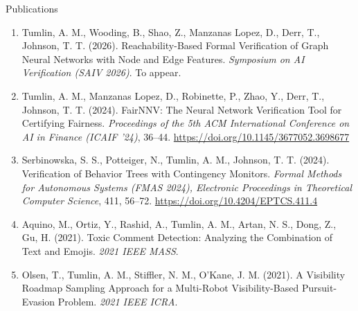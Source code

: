 \documentclass{resume}
\begin{document}
\begin{rSection}{Publications}
\begin{enumerate}
    \item Tumlin, A. M., Wooding, B., Shao, Z., Manzanas Lopez, D., Derr, T., Johnson, T. T. (2026). Reachability-Based Formal Verification of Graph Neural Networks with Node and Edge Features. \textit{Symposium on AI Verification (SAIV 2026)}. To appear.
    \item Tumlin, A. M., Manzanas Lopez, D., Robinette, P., Zhao, Y., Derr, T., Johnson, T. T. (2024). FairNNV: The Neural Network Verification Tool for Certifying Fairness. \textit{Proceedings of the 5th ACM International Conference on AI in Finance (ICAIF '24)}, 36--44. \url{https://doi.org/10.1145/3677052.3698677}
    \item Serbinowska, S. S., Potteiger, N., Tumlin, A. M., Johnson, T. T. (2024). Verification of Behavior Trees with Contingency Monitors. \textit{Formal Methods for Autonomous Systems (FMAS 2024), Electronic Proceedings in Theoretical Computer Science}, 411, 56--72. \url{https://doi.org/10.4204/EPTCS.411.4}
    \item Aquino, M., Ortiz, Y., Rashid, A., Tumlin, A. M., Artan, N. S., Dong, Z., Gu, H. (2021). Toxic Comment Detection: Analyzing the Combination of Text and Emojis. \textit{2021 IEEE MASS}.
    \item Olsen, T., Tumlin, A. M., Stiffler, N. M., O'Kane, J. M. (2021). A Visibility Roadmap Sampling Approach for a Multi-Robot Visibility-Based Pursuit-Evasion Problem. \textit{2021 IEEE ICRA}.
\end{enumerate}
\end{rSection}

\end{document}
